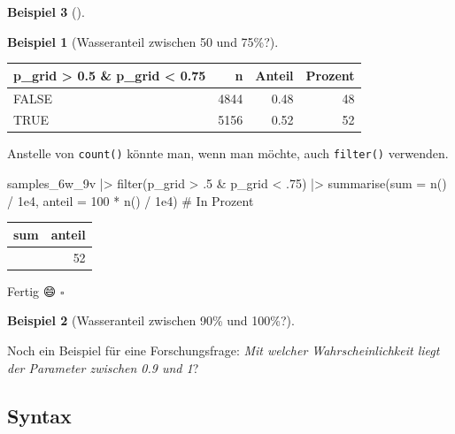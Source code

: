 \documentclass[
  ngerman,
  letterpaper,
  twoside,
  open=any]{scrbook}
\newenvironment{Shaded}{\begin{snugshade}}{\end{snugshade}}
\newcommand{\AttributeTok}[1]{\textcolor[rgb]{0.40,0.45,0.13}{#1}}
\newcommand{\CommentTok}[1]{\textcolor[rgb]{0.37,0.37,0.37}{#1}}
\newcommand{\DecValTok}[1]{\textcolor[rgb]{0.68,0.00,0.00}{#1}}
\newcommand{\FloatTok}[1]{\textcolor[rgb]{0.68,0.00,0.00}{#1}}
\newcommand{\FunctionTok}[1]{\textcolor[rgb]{0.28,0.35,0.67}{#1}}
\newcommand{\NormalTok}[1]{\textcolor[rgb]{0.00,0.23,0.31}{#1}}
\newcommand{\SpecialCharTok}[1]{\textcolor[rgb]{0.37,0.37,0.37}{#1}}
\newcounter{none} %
\theoremstyle{definition}
\newtheorem{example}{Beispiel}[chapter]
\theoremstyle{plain}
\theoremstyle{definition}
\theoremstyle{definition}
\theoremstyle{remark}
\begin{document}
\begin{example}[]
\begin{example}[Wasseranteil zwischen 50 und
75\%?]
{\def\LTcaptype{none} %
\begin{longtable}[]{@{}lrrr@{}}
\toprule\noalign{}
p\_grid \textgreater{} 0.5 \& p\_grid \textless{} 0.75 & n & Anteil &
Prozent \\
\midrule\noalign{}
\endhead
\bottomrule\noalign{}
\endlastfoot
FALSE & 4844 & 0.48 & 48 \\
TRUE & 5156 & 0.52 & 52 \\
\end{longtable}
}

Anstelle von \texttt{count()} könnte man, wenn man möchte, auch
\texttt{filter()} verwenden.

\begin{Shaded}
\begin{Highlighting}[]
\NormalTok{samples\_6w\_9v }\SpecialCharTok{|\textgreater{}} 
  \FunctionTok{filter}\NormalTok{(p\_grid }\SpecialCharTok{\textgreater{}}\NormalTok{ .}\DecValTok{5} \SpecialCharTok{\&}\NormalTok{ p\_grid }\SpecialCharTok{\textless{}}\NormalTok{ .}\DecValTok{75}\NormalTok{) }\SpecialCharTok{|\textgreater{}} 
  \FunctionTok{summarise}\NormalTok{(}\AttributeTok{sum     =}       \FunctionTok{n}\NormalTok{() }\SpecialCharTok{/} \FloatTok{1e4}\NormalTok{,}
            \AttributeTok{anteil =} \DecValTok{100} \SpecialCharTok{*} \FunctionTok{n}\NormalTok{() }\SpecialCharTok{/} \FloatTok{1e4}\NormalTok{)  }\CommentTok{\# In Prozent}
\end{Highlighting}
\end{Shaded}

{\def\LTcaptype{none} %
\begin{longtable}[]{@{}rr@{}}
\toprule\noalign{}
sum & anteil \\
\midrule\noalign{}
\endhead
\bottomrule\noalign{}
\endlastfoot
0.52 & 52 \\
\end{longtable}
}

Fertig 😄 \(\square\)

\end{example}

\begin{example}[Wasseranteil zwischen 90\% und
100\%?]\protect\hypertarget{exm-param3}{}\label{exm-param3}

Noch ein Beispiel für eine Forschungsfrage: \emph{Mit welcher
Wahrscheinlichkeit liegt der Parameter zwischen 0.9 und 1}?

\subsection{Syntax}


\end{example}
\end{example}
\end{document}
